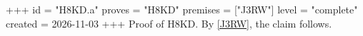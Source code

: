 +++
id = "H8KD.a"
proves = "H8KD"
premises = ["J3RW"]
level = "complete"
created = 2026-11-03
+++
Proof of H8KD. By \ref{J3RW}, the claim follows.
